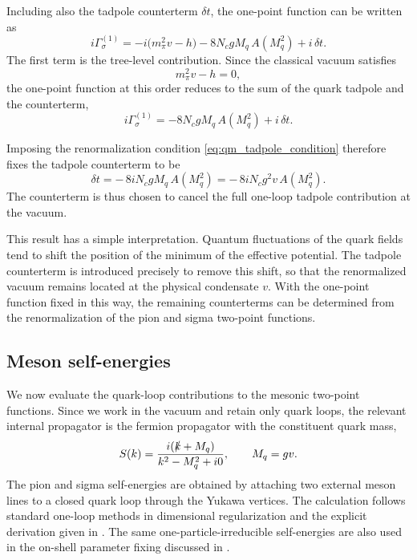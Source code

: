 Including also the tadpole counterterm \(\delta t\), the one-point
function can be written as
\begin{equation}
i\Gamma^{(1)}_{\sigma}
=
-i\bigl(m_\pi^2 v - h\bigr)
- 8 N_c g M_q\, A(M_q^2)
+ i\,\delta t .
\label{eq:qm_one_point_function}
\end{equation}
The first term is the tree-level contribution. Since the classical
vacuum satisfies
\begin{equation}
m_\pi^2 v - h = 0 ,
\label{eq:qm_tree_level_stationarity}
\end{equation}
the one-point function at this order reduces to the sum of the quark
tadpole and the counterterm,
\begin{equation}
i\Gamma^{(1)}_{\sigma}
=
- 8 N_c g M_q\, A(M_q^2)
+ i\,\delta t .
\label{eq:qm_one_point_reduced}
\end{equation}

Imposing the renormalization condition
\eqref{eq:qm_tadpole_condition} therefore fixes the tadpole
counterterm to be
\begin{equation}
\delta t
=
-\,8 i N_c g M_q\, A(M_q^2)
=
-\,8 i N_c g^2 v\, A(M_q^2).
\label{eq:qm_tadpole_counterterm}
\end{equation}
The counterterm is thus chosen to cancel the full one-loop tadpole
contribution at the vacuum.

This result has a simple interpretation. Quantum fluctuations of the
quark fields tend to shift the position of the minimum of the
effective potential. The tadpole counterterm is introduced precisely
to remove this shift, so that the renormalized vacuum remains located
at the physical condensate \(v\). With the one-point function fixed in
this way, the remaining counterterms can be determined from the
renormalization of the pion and sigma two-point functions.

\subsection{Meson self-energies}

We now evaluate the quark-loop contributions to the mesonic two-point
functions. Since we work in the vacuum and retain only quark loops,
the relevant internal propagator is the fermion propagator with the
constituent quark mass,
\begin{equation}
S(k)=\frac{i(\slashed{k}+M_q)}{k^2-M_q^2+i0},
\qquad
M_q = gv .
\end{equation}
The pion and sigma self-energies are obtained by attaching two
external meson lines to a closed quark loop through the Yukawa
vertices. The calculation follows standard one-loop methods in
dimensional regularization \cite{PeskinSchroeder1995,WeinbergQFT} and
the explicit derivation given in \cite{Folkestad2018}. The same
one-particle-irreducible self-energies are also used in the on-shell
parameter fixing discussed in \cite{Andersen2024}.

